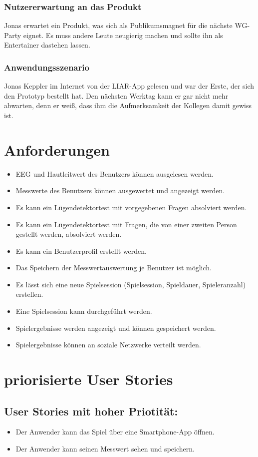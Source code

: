 \documentclass[10pt, a4paper, oneside, titlepage]{scrartcl} %
\begin{document}
	\subsubsection{Nutzererwartung an das Produkt}
	Jonas erwartet ein Produkt, was sich als Publikumsmagnet für die nächste WG-Party eignet. Es muss andere Leute neugierig machen und sollte ihn als Entertainer dastehen lassen. 
	\subsubsection{Anwendungsszenario}
	Jonas Keppler im Internet von der LIAR-App gelesen und war der Erste, der sich den Prototyp bestellt hat. Den nächsten Werktag kann er gar nicht mehr abwarten, denn er weiß, dass ihm die Aufmerksamkeit der Kollegen damit gewiss ist.
	
   	\section{Anforderungen}
	\begin{itemize}
	\item{}EEG und Hautleitwert des Benutzers können ausgelesen werden.
	\item{}Messwerte des Benutzers können ausgewertet und angezeigt werden.
	\item{}Es kann ein Lügendetektortest  mit vorgegebenen Fragen absolviert werden.
	\item{}Es kann ein Lügendetektortest mit Fragen, die von einer zweiten Person gestellt werden, absolviert werden.
	\item{}Es kann ein Benutzerprofil erstellt werden.
	\item{}Das Speichern der Messwertauswertung je Benutzer ist möglich.
	\item{}Es lässt sich eine neue Spielsession (Spielsession, Spieldauer, Spieleranzahl) erstellen.
	\item{}Eine Spielsession kann durchgeführt werden.
	\item{}Spielergebnisse werden angezeigt und können gespeichert werden.
	\item{}Spielergebnisse können an soziale Netzwerke verteilt werden.
	\end{itemize}		
	
	\newpage	
	\section{priorisierte User Stories}	
	\subsection{User Stories mit hoher Priotität:}
	\begin{itemize}
	\item{}Der Anwender kann das Spiel über eine Smartphone-App öffnen.
	\item{}Der Anwender kann seinen Messwert sehen und speichern.
	\end{itemize}
\end{document}
